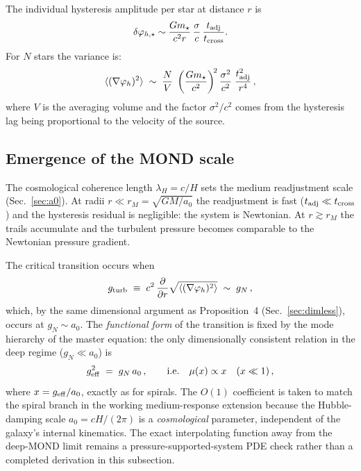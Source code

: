 \documentclass[11pt]{article}
\begin{document}
The individual hysteresis amplitude per star at distance $r$ is
\[
  \delta\varphi_{h,\star}
  \sim \frac{Gm_\star}{c^2 r}\,\frac{\sigma}{c}\,
  \frac{t_{\rm adj}}{t_{\rm cross}}.
\]
For $N$ stars the variance is:
\begin{equation}
  \langle(\nabla\varphi_h)^2\rangle
  \;\sim\;
  \frac{N}{V}\;\left(\frac{Gm_\star}{c^2}\right)^{\!2}
  \frac{\sigma^2}{c^2}\;\frac{t_{\rm adj}^2}{r^4}\,,
\label{eq:turb_variance}
\end{equation}
where $V$ is the averaging volume and the factor $\sigma^2/c^2$ comes from the
hysteresis lag being proportional to the velocity of the source.

\subsection{Emergence of the MOND scale}

The cosmological coherence length $\lambda_H = c/H$ sets the medium
readjustment scale (Sec.~\ref{sec:a0}).
At radii $r \ll r_M = \sqrt{GM/a_0}$ the readjustment is fast
($t_{\rm adj} \ll t_{\rm cross}$) and the hysteresis residual is
negligible: the system is Newtonian.  At $r \gtrsim r_M$
the trails accumulate and the turbulent pressure becomes comparable
to the Newtonian pressure gradient.

The critical transition occurs when
\begin{equation}
  g_{\rm turb}
  \;\equiv\;
  c^2\,\frac{\partial}{\partial r}
  \sqrt{\langle(\nabla\varphi_h)^2\rangle}
  \;\sim\; g_N\,,
\label{eq:g_turb}
\end{equation}
which, by the same dimensional argument as Proposition~4
(Sec.~\ref{sec:dimless}), occurs at $g_N \sim a_0$.
The \emph{functional form} of the transition is fixed by the mode
hierarchy of the master equation: the only dimensionally consistent
relation in the deep regime ($g_N \ll a_0$) is
\begin{equation}
  g_{\rm eff}^2 \;=\; g_N\,a_0\,,
  \qquad\text{i.e.}\quad
  \mu(x) \propto x
  \quad (x \ll 1)\,,
\label{eq:deepmond_ell}
\end{equation}
where $x = g_{\rm eff}/a_0$, exactly as for spirals.  The $O(1)$
coefficient is taken to match the spiral branch in the working
medium-response extension because the Hubble-damping scale
$a_0 = cH/(2\pi)$ is a \emph{cosmological} parameter, independent of
the galaxy's internal kinematics.  The exact interpolating function
away from the deep-MOND limit remains a pressure-supported-system PDE
check rather than a completed derivation in this subsection.
\end{document}
